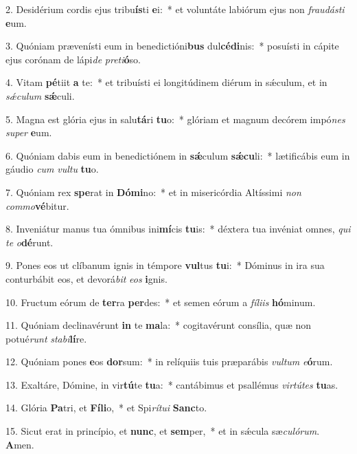 2. Desidérium cordis ejus tribu\textbf{ís}ti \textbf{e}i:~*  et voluntáte labiórum ejus non \textit{frau}\textit{dás}\textit{ti} \textbf{e}um.\

3. Quóniam prævenísti eum in benedictióni\textbf{bus} dul\textbf{cé}\textbf{di}nis:~*  posuísti in cápite ejus corónam de lápi\textit{de} \textit{pre}\textit{ti}\textbf{ó}so.\

4. Vitam \textbf{pé}tiit \textbf{a} te:~*  et tribuísti ei longitúdinem diérum in sǽculum, et in \textit{sǽ}\textit{cu}\textit{lum} \textbf{sǽ}culi.\

5. Magna est glória ejus in salu\textbf{tá}ri \textbf{tu}o:~*  glóriam et magnum decórem impó\textit{nes} \textit{su}\textit{per} \textbf{e}um.\

6. Quóniam dabis eum in benedictiónem in \textbf{sǽ}culum \textbf{sǽ}\textbf{cu}li:~*  lætificábis eum in gáudio \textit{cum} \textit{vul}\textit{tu} \textbf{tu}o.\

7. Quóniam rex \textbf{spe}rat in \textbf{Dó}\textbf{mi}no:~*  et in misericórdia Altíssimi \textit{non} \textit{com}\textit{mo}\textbf{vé}bitur.\

8. Inveniátur manus tua ómnibus ini\textbf{mí}cis \textbf{tu}is:~*  déxtera tua invéniat omnes, \textit{qui} \textit{te} \textit{o}\textbf{dé}runt.\

9. Pones eos ut clíbanum ignis in témpore \textbf{vul}tus \textbf{tu}i:~*  Dóminus in ira sua conturbábit eos, et devorá\textit{bit} \textit{e}\textit{os} \textbf{i}gnis.\

10. Fructum eórum de \textbf{ter}ra \textbf{per}des:~*  et semen eórum a \textit{fí}\textit{li}\textit{is} \textbf{hó}minum.\

11. Quóniam declinavérunt \textbf{in} te \textbf{ma}la:~*  cogitavérunt consília, quæ non potué\textit{runt} \textit{sta}\textit{bi}\textbf{lí}re.\

12. Quóniam pones \textbf{e}os \textbf{dor}sum:~*  in relíquiis tuis præparábis \textit{vul}\textit{tum} \textit{e}\textbf{ó}rum.\

13. Exaltáre, Dómine, in vir\textbf{tú}te \textbf{tu}a:~*  cantábimus et psallémus \textit{vir}\textit{tú}\textit{tes} \textbf{tu}as.\

14. Glória \textbf{Pa}tri, et \textbf{Fí}\textbf{li}o,~*  et Spi\textit{rí}\textit{tu}\textit{i} \textbf{Sanc}to.\

15. Sicut erat in princípio, et \textbf{nunc}, et \textbf{sem}per,~*  et in sǽcula sæ\textit{cu}\textit{ló}\textit{rum}. \textbf{A}men.\

